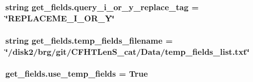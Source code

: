 \hypertarget{namespaceget__fields_affc74620547f037f75fe790e1779c8e3}{
\subsubsection[{query\-\_\-i\-\_\-or\-\_\-y\-\_\-replace\-\_\-tag}]{\setlength{\rightskip}{0pt plus 5cm}string get\-\_\-fields.\-query\-\_\-i\-\_\-or\-\_\-y\-\_\-replace\-\_\-tag = \char`\"{}R\-E\-P\-L\-A\-C\-E\-M\-E\-\_\-\-I\-\_\-\-O\-R\-\_\-\-Y\char`\"{}}}\label{namespaceget__fields_affc74620547f037f75fe790e1779c8e3}
\hypertarget{namespaceget__fields_ae514686f8470f3add83948b4d065b08a}{
\subsubsection[{temp\-\_\-fields\-\_\-filename}]{\setlength{\rightskip}{0pt plus 5cm}string get\-\_\-fields.\-temp\-\_\-fields\-\_\-filename = \char`\"{}/disk2/brg/git/C\-F\-H\-T\-Len\-S\-\_\-cat/Data/temp\-\_\-fields\-\_\-list.\-txt\char`\"{}}}\label{namespaceget__fields_ae514686f8470f3add83948b4d065b08a}
\hypertarget{namespaceget__fields_ae435259fd2d90d5c6fb2f274152bf709}{
\subsubsection[{use\-\_\-temp\-\_\-fields}]{\setlength{\rightskip}{0pt plus 5cm}get\-\_\-fields.\-use\-\_\-temp\-\_\-fields = True}}\label{namespaceget__fields_ae435259fd2d90d5c6fb2f274152bf709}
